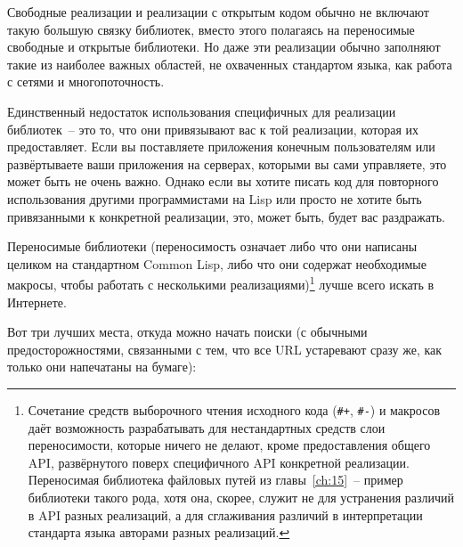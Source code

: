 Свободные реализации и реализации с открытым кодом обычно не включают такую большую связку
библиотек, вместо этого полагаясь на переносимые свободные и открытые библиотеки. Но даже
эти реализации обычно заполняют такие из наиболее важных областей, не охваченных
стандартом языка, как работа с сетями и многопоточность.

Единственный недостаток использования специфичных для реализации библиотек~-- это то, что
они привязывают вас к той реализации, которая их предоставляет. Если вы поставляете
приложения конечным пользователям или развёртываете ваши приложения на серверах, которыми
вы сами управляете, это может быть не очень важно. Однако если вы хотите писать код для
повторного использования другими программистами на Lisp или просто не хотите быть
привязанными к конкретной реализации, это, может быть, будет вас раздражать.

Переносимые библиотеки (переносимость означает либо что они написаны целиком на
стандартном Common Lisp, либо что они содержат необходимые макросы, чтобы работать с
несколькими реализациями)\footnote{Сочетание средств выборочного чтения исходного кода
  (\lstinline!#+!, \lstinline!#-!) и макросов даёт возможность разрабатывать для
  нестандартных средств слои переносимости, которые ничего не делают, кроме предоставления
  общего API, развёрнутого поверх специфичного API конкретной реализации. Переносимая
  библиотека файловых путей из главы~\ref{ch:15}~-- пример библиотеки такого рода, хотя
  она, скорее, служит не для устранения различий в API разных реализаций, а для сглаживания
  различий в интерпретации стандарта языка авторами разных реализаций.} лучше всего искать
в Интернете.

Вот три лучших места, откуда можно начать поиски (с обычными предосторожностями,
связанными с тем, что все URL устаревают сразу же, как только они напечатаны на бумаге):

